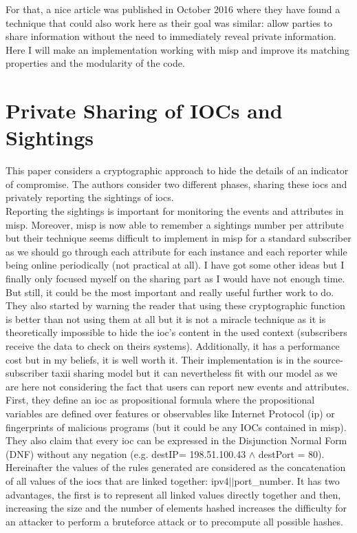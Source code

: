 \documentclass{eplmastersthesis}
\begin{document}
For that, a nice article \cite{van2016private} was published in October 2016 where they have found a technique that could also work here as their goal was similar: allow parties to share information without the need to immediately reveal private information.
Here I will make an implementation working with \gls{misp} and improve its matching properties and the modularity of the code. 

\section{Private Sharing of IOCs and Sightings \cite{van2016private}}
\label{sec:articlePrivate}
This paper considers a cryptographic approach to hide the details of an indicator of compromise. The authors consider two different phases, sharing these \glspl{ioc} and privately reporting the sightings of \glspl{ioc}.\\

Reporting the sightings is important for monitoring the events and attributes in \gls{misp}.
Moreover, \gls{misp} is now able to remember a sightings number per attribute but their technique seems difficult to implement in \gls{misp} for a standard subscriber as we should go through each attribute for each instance and each reporter while being online periodically (not practical at all). I have got some other ideas but I finally only focused myself on the sharing part as I would have not enough time.
But still, it could be the most important and really useful further work to do.\\

They also started by warning the reader that using these cryptographic function is better than not using them at all but it is not a miracle technique as it is theoretically impossible to hide the \gls{ioc}’s content in the used context (subscribers receive the data to check on theirs systems).
Additionally, it has a performance cost but in my beliefs, it is well worth it. Their implementation is in the source-subscriber \gls{taxii} sharing model but it can nevertheless fit with our model as we are here not considering the fact that users can report new events and attributes.
First, they define an \gls{ioc} as propositional formula where the propositional variables are defined over features or observables like Internet Protocol (\gls{ip}) or fingerprints of malicious programs (but it could be any IOCs contained in \gls{misp}). They also claim that every \gls{ioc} can be expressed in the Disjunction Normal Form (DNF) without any negation (e.g. destIP= 198.51.100.43 $\land$ destPort = 80).
Hereinafter the values of the rules generated are considered as the concatenation of all values of the \glspl{ioc} that are linked together: \gls{ipv4}$||$port\_number. It has two advantages, the first is to represent all linked values directly together and then, increasing the size and the number of elements hashed increases the difficulty for an attacker to perform a bruteforce attack or to precompute all possible hashes.\\
\end{document}
